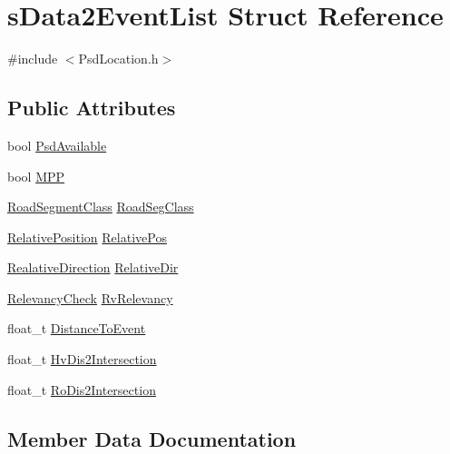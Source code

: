 \hypertarget{structs_data2_event_list}{}\section{s\+Data2\+Event\+List Struct Reference}
\label{structs_data2_event_list}


{\ttfamily \#include $<$Psd\+Location.\+h$>$}

\subsection*{Public Attributes}
\begin{DoxyCompactItemize}
\item 
bool \hyperlink{structs_data2_event_list_a5d5bc3584b3aafb9bd3a56856e1602b8}{Psd\+Available}
\item 
bool \hyperlink{structs_data2_event_list_a6eac70b9a1ac9ba29669a8749cf1f781}{M\+PP}
\item 
\hyperlink{_psd_message_decoder_8h_a4f9adeb93dfc3dac7961fa97e890b1a5}{Road\+Segment\+Class} \hyperlink{structs_data2_event_list_ac1f8a0283e7637e026de71131ab0cdc9}{Road\+Seg\+Class}
\item 
\hyperlink{_psd_location_8h_abcb85fd51379afdf750bdda1dec9174c}{Relative\+Position} \hyperlink{structs_data2_event_list_a056ab34b1bfd87ef115c7f24de027747}{Relative\+Pos}
\item 
\hyperlink{_psd_location_8h_ae65d9d286580719610837075ffad7232}{Realative\+Direction} \hyperlink{structs_data2_event_list_a30359841152380fb71a6739065130d2d}{Relative\+Dir}
\item 
\hyperlink{_psd_location_8h_ad3abb902810ad80bbc508a024f5af264}{Relevancy\+Check} \hyperlink{structs_data2_event_list_a98dfc70a0cf391e70011f3037065d55e}{Rv\+Relevancy}
\item 
float\+\_\+t \hyperlink{structs_data2_event_list_a8d0cdd8a162e4eb46d9a8e2632325257}{Distance\+To\+Event}
\item 
float\+\_\+t \hyperlink{structs_data2_event_list_ac29b186aa6301f23c45cc2d5f24f6820}{Hv\+Dis2\+Intersection}
\item 
float\+\_\+t \hyperlink{structs_data2_event_list_aab749bc845a1ce305d1a28ef1bbc0d2f}{Ro\+Dis2\+Intersection}
\end{DoxyCompactItemize}


\subsection{Member Data Documentation}
\mbox{\label{structs_data2_event_list_a8d0cdd8a162e4eb46d9a8e2632325257}} 
